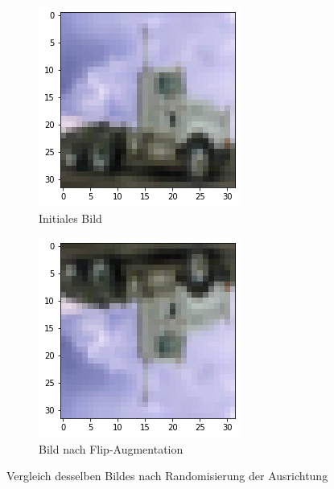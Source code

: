 \begin{figure}[htb]
	\begin{subfigure}[ht]{.5\textwidth}
		\includegraphics[width=\textwidth]{images/flip}
		\caption{Initiales Bild}
		\label{fig:flip}
	\end{subfigure}\hfill%
	\begin{subfigure}[ht]{.5\textwidth}
		\includegraphics[width=\textwidth]{images/flip_a}
		\caption{Bild nach Flip-Augmentation}
		\label{fig:flip_a}
	\end{subfigure}\hfill%
	\caption{Vergleich desselben Bildes nach Randomisierung der Ausrichtung}
\end{figure}


